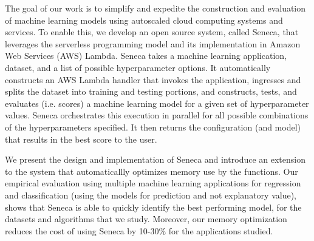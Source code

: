 
The goal of our work is to simplify and expedite the 
construction and evaluation of machine learning models 
using autoscaled cloud computing systems and services.
To enable this, we develop an open source system, called Seneca, that leverages
the serverless programming model and its implementation in Amazon Web Services
(AWS) Lambda.  
Seneca takes a machine learning application, dataset, and a list of 
possible hyperparameter options.  It automatically constructs an AWS Lambda
handler that invokes the application, ingresses and splits the dataset into training
and testing portions, and constructs, tests, and evaluates (i.e. scores) a machine
learning model for a given set of hyperparameter values.  Seneca orchestrates
this execution in parallel for all possible combinations of the hyperparameters specified.
It then returns the configuration (and model) that results in the best score 
to the user.  

We present the design and implementation of Seneca and introduce an extension to the
system that automaticallly optimizes memory use by the functions.  
Our empirical evaluation using
multiple machine learning applications for regression and classification (using
the models for prediction and not explanatory value), shows that Seneca is able to quickly
identify the best performing model,
for the datasets and algorithms that we study. 
Moreover, our memory optimization reduces the cost of using
Seneca by 10-30\% for the applications studied.

